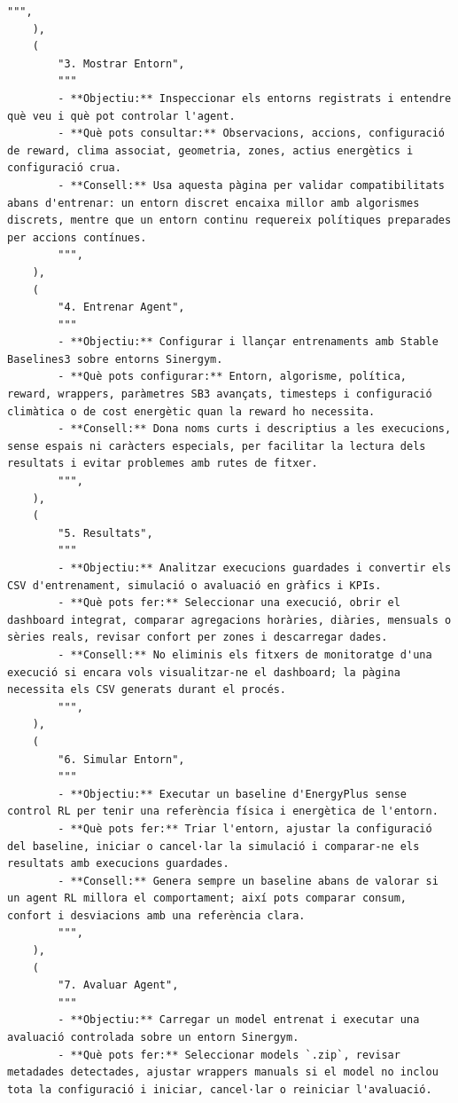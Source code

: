 \documentclass[10pt,a4paper]{article}
\begin{document}
\begin{lstlisting}[style=studioPython,caption={pages/Ajuda.py},label={lst:pages-ajuda-py}]
        """,
    ),
    (
        "3. Mostrar Entorn",
        """
        - **Objectiu:** Inspeccionar els entorns registrats i entendre què veu i què pot controlar l'agent.
        - **Què pots consultar:** Observacions, accions, configuració de reward, clima associat, geometria, zones, actius energètics i configuració crua.
        - **Consell:** Usa aquesta pàgina per validar compatibilitats abans d'entrenar: un entorn discret encaixa millor amb algorismes discrets, mentre que un entorn continu requereix polítiques preparades per accions contínues.
        """,
    ),
    (
        "4. Entrenar Agent",
        """
        - **Objectiu:** Configurar i llançar entrenaments amb Stable Baselines3 sobre entorns Sinergym.
        - **Què pots configurar:** Entorn, algorisme, política, reward, wrappers, paràmetres SB3 avançats, timesteps i configuració climàtica o de cost energètic quan la reward ho necessita.
        - **Consell:** Dona noms curts i descriptius a les execucions, sense espais ni caràcters especials, per facilitar la lectura dels resultats i evitar problemes amb rutes de fitxer.
        """,
    ),
    (
        "5. Resultats",
        """
        - **Objectiu:** Analitzar execucions guardades i convertir els CSV d'entrenament, simulació o avaluació en gràfics i KPIs.
        - **Què pots fer:** Seleccionar una execució, obrir el dashboard integrat, comparar agregacions horàries, diàries, mensuals o sèries reals, revisar confort per zones i descarregar dades.
        - **Consell:** No eliminis els fitxers de monitoratge d'una execució si encara vols visualitzar-ne el dashboard; la pàgina necessita els CSV generats durant el procés.
        """,
    ),
    (
        "6. Simular Entorn",
        """
        - **Objectiu:** Executar un baseline d'EnergyPlus sense control RL per tenir una referència física i energètica de l'entorn.
        - **Què pots fer:** Triar l'entorn, ajustar la configuració del baseline, iniciar o cancel·lar la simulació i comparar-ne els resultats amb execucions guardades.
        - **Consell:** Genera sempre un baseline abans de valorar si un agent RL millora el comportament; així pots comparar consum, confort i desviacions amb una referència clara.
        """,
    ),
    (
        "7. Avaluar Agent",
        """
        - **Objectiu:** Carregar un model entrenat i executar una avaluació controlada sobre un entorn Sinergym.
        - **Què pots fer:** Seleccionar models `.zip`, revisar metadades detectades, ajustar wrappers manuals si el model no inclou tota la configuració i iniciar, cancel·lar o reiniciar l'avaluació.

\end{lstlisting}
\end{document}
